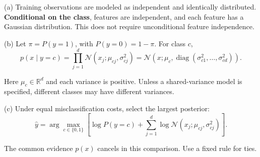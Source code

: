 (a) Training observations are modeled as independent and identically distributed. \textbf{Conditional on the class}, features are independent, and each feature has a Gaussian distribution. This does not require unconditional feature independence.


(b) Let \(\pi=P(y=1)\), with \(P(y=0)=1-\pi\). For class \(c\),
\[
p(x\mid y=c)=\prod_{j=1}^d\mathcal N(x_j;\mu_{cj},\sigma^2_{cj})=\mathcal N(x;\mu_c,\operatorname{diag}(\sigma^2_{c1},\ldots,\sigma^2_{cd})).
\]


Here \(\mu_c\in\mathbb R^d\) and each variance is positive. Unless a shared-variance model is specified, different classes may have different variances.


(c) Under equal misclassification costs, select the largest posterior:
\[
\hat y=\arg\max_{c\in\{0,1\}}\left[\log P(y=c)+\sum_{j=1}^d\log\mathcal N(x_j;\mu_{cj},\sigma^2_{cj})\right].
\]


The common evidence \(p(x)\) cancels in this comparison. Use a fixed rule for ties.
